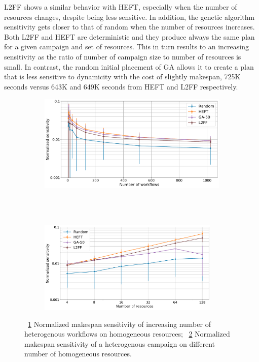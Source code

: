 L2FF shows a similar behavior with HEFT, especially when the number of resources changes, despite being less sensitive.
In addition, the genetic algorithm sensitivity gets closer to that of random when the number of resources increases.
Both L2FF and HEFT are deterministic and they produce always the same plan for a given campaign and set of resources.
This in turn results to an increasing sensitivity as the ratio of number of campaign size to number of resources is small.
In contrast, the random initial placement of GA allows it to create a plan that is less sensitive to dynamicity with the cost of slightly makespan, 725K seconds versus 643K and 649K seconds from HEFT and L2FF respectively.

\begin{figure}[ht!]
    \centering
    \begin{subfigure}[b]{0.85\textwidth}
        \includegraphics[width=.95\textwidth]{figures/campaign/StHeteroCampaigns_4DynHomoResourcesSens.pdf}
        \caption{}
        \label{fig:StHeteroCampaigns_4DynHomoResourcesSens}
    \end{subfigure}\\
    ~ 
    \begin{subfigure}[b]{0.85\textwidth}
        \includegraphics[width=0.95\textwidth]{figures/campaign/DynHomoResources_StHeteroCampaignsSens.pdf}
        \caption{}
        \label{fig:DynHomoResources_StHeteroCampaignsSens}
    \end{subfigure}
    \caption{~\ref{fig:StHeteroCampaigns_4DynHomoResourcesSens} Normalized makespan sensitivity  of increasing number of heterogenous workflows on homogeneous resources;
        ~\ref{fig:DynHomoResources_StHeteroCampaignsSens} Normalized makespan sensitivity  of a heterogenous campaign on different number of homogeneous resources.}
    \label{fig:dyn_hetero_homog_sens_analysis}
\end{figure}

